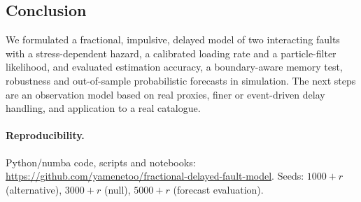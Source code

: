 \documentclass[10pt,a4paper]{article}
\begin{document}
\subsection{Conclusion}
We formulated a fractional, impulsive, delayed model of two interacting faults with a stress-dependent hazard, a calibrated loading rate and a particle-filter likelihood, and evaluated estimation accuracy, a boundary-aware memory test, robustness and out-of-sample probabilistic forecasts in simulation. The next steps are an observation model based on real proxies, finer or event-driven delay handling, and application to a real catalogue.

\paragraph{Reproducibility.} Python/numba code, scripts and notebooks: \url{https://github.com/yamenetoo/fractional-delayed-fault-model}. Seeds: $1000+r$ (alternative), $3000+r$ (null), $5000+r$ (forecast evaluation).
\end{document}
